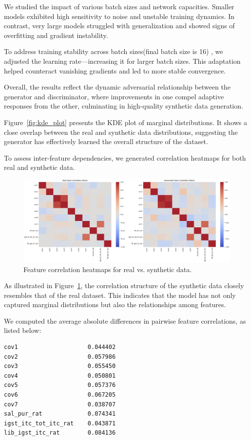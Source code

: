 \documentclass[12pt, a4paper, twocolumn]{article}
\begin{document}
We studied the impact of various batch sizes and network capacities. Smaller models exhibited high sensitivity to noise and unstable training dynamics. In contrast, very large models struggled with generalization and showed signs of overfitting and gradient instability.

To address training stability across batch sizes(final batch size is 16) , we adjusted the learning rate—increasing it for larger batch sizes. This adaptation helped counteract vanishing gradients and led to more stable convergence.

Overall, the results reflect the dynamic adversarial relationship between the generator and discriminator, where improvements in one compel adaptive responses from the other, culminating in high-quality synthetic data generation.

Figure~\ref{fig:kde_plot} presents the KDE plot of marginal distributions. It shows a close overlap between the real and synthetic data distributions, suggesting the generator has effectively learned the overall structure of the dataset.

To assess inter-feature dependencies, we generated correlation heatmaps for both real and synthetic data.

\begin{figure}[!ht]
\centering
\includegraphics[width=6in]{correlation.png}
\caption{Feature correlation heatmaps for real vs. synthetic data.}
\label{fig:correlation_heatmap}
\end{figure}

As illustrated in Figure~\ref{fig:correlation_heatmap}, the correlation structure of the synthetic data closely resembles that of the real dataset. This indicates that the model has not only captured marginal distributions but also the relationships among features.

We computed the average absolute differences in pairwise feature correlations, as listed below:

\begin{verbatim}
cov1                    0.044402
cov2                    0.057986
cov3                    0.055450
cov4                    0.050801
cov5                    0.057376
cov6                    0.067205
cov7                    0.038707
sal_pur_rat             0.074341
igst_itc_tot_itc_rat    0.043871
lib_igst_itc_rat        0.084136
\end{verbatim}
\end{document}
